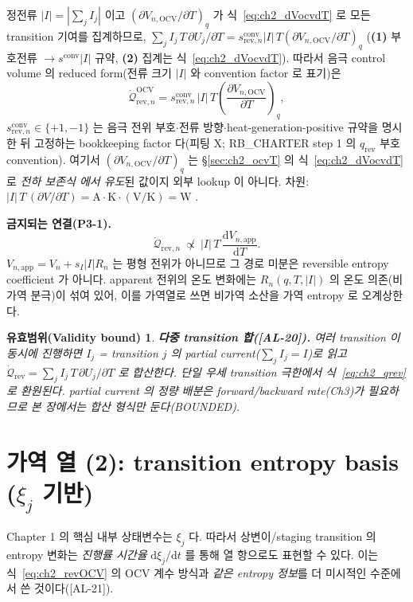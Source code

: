 \documentclass[11pt,a4paper]{article}
\newtheorem*{boundbox}{유효범위(Validity bound)}
\newcommand{\dd}{\mathrm{d}}
\newcommand{\app}{\mathrm{app}}
\newcommand{\OCV}{\mathrm{OCV}}
\newcommand{\rev}{\mathrm{rev}}
\newcommand{\conv}{\mathrm{conv}}
\newcommand{\AL}[1]{\textsf{[AL-#1]}}
\begin{document}
정전류 $|I|=|\sum_j I_j|$ 이고 $(\partial V_{n,\OCV}/\partial T)_q$ 가 식~\eqref{eq:ch2_dVocvdT} 로 모든 transition
기여를 집계하므로, $\sum_j I_j\,T\,\partial U_j/\partial T=s_{\rev,n}^{\conv}|I|\,T(\partial V_{n,\OCV}/\partial T)_q$
(\textbf{(1)} 부호전류 $\to s^{\conv}|I|$ 규약, \textbf{(2)} 집계는 식~\eqref{eq:ch2_dVocvdT}). 따라서 음극
control volume 의 reduced form(전류 크기 $|I|$ 와 convention factor 로 표기)은
\begin{equation}
\dot{\mathcal Q}_{\rev,n}^{\OCV}=s_{\rev,n}^{\conv}\,|I|\,T\left(\frac{\partial V_{n,\OCV}}{\partial T}\right)_q,
\label{eq:ch2_revOCV}
\end{equation}
$s_{\rev,n}^{\conv}\in\{+1,-1\}$ 는 음극 전위 부호$\cdot$전류 방향$\cdot$heat-generation-positive 규약을 명시한
뒤 고정하는 bookkeeping factor 다(피팅 X; RB\_CHARTER step 1 의 $q_\rev$ 부호 convention). 여기서
$(\partial V_{n,\OCV}/\partial T)_q$ 는 \S\ref{sec:ch2_ocvT} 의 식~\eqref{eq:ch2_dVocvdT} 로 \emph{전하 보존식
에서 유도}된 값이지 외부 lookup 이 아니다. 차원: $|I|\,T\,(\partial V/\partial T)=\mathrm A\cdot\mathrm K\cdot
\mathrm{(V/K)}=\mathrm W$ \checkmark.

\textbf{금지되는 연결(P3-1).}
\begin{equation}
\dot{\mathcal Q}_{\rev,n}\ \not\propto\ |I|\,T\,\frac{\dd V_{n,\app}}{\dd T}.
\label{eq:ch2_forbidden}
\end{equation}
$V_{n,\app}=V_n+s_I|I|R_n$ 는 평형 전위가 아니므로 그 경로 미분은 reversible entropy coefficient 가 아니다.
apparent 전위의 온도 변화에는 $R_n(q,T,|I|)$ 의 온도 의존(비가역 분극)이 섞여 있어, 이를 가역열로 쓰면 비가역
소산을 가역 entropy 로 오계상한다.
\begin{boundbox}
\textbf{다중 transition 합(\AL{20}).} 여러 transition 이 동시에 진행하면 $I_j$ = transition $j$ 의 partial
current($\sum_j I_j=I$)로 읽고 $\dot{\mathcal Q}_{\rev}=\sum_j I_j\,T\,\partial U_j/\partial T$ 로 합산한다.
단일 우세 transition 극한에서 식~\eqref{eq:ch2_qrev} 로 환원된다. partial current 의 정량 배분은 forward/backward
rate(Ch3)가 필요하므로 본 장에서는 합산 형식만 둔다(BOUNDED).
\end{boundbox}

\section{가역 열 (2): transition entropy basis ($\xi_j$ 기반)}\label{sec:ch2_revxi}
Chapter 1 의 핵심 내부 상태변수는 $\xi_j$ 다. 따라서 상변이/staging transition 의 entropy 변화는 \emph{진행률
시간율} $\dd\xi_j/\dd t$ 를 통해 열 항으로도 표현할 수 있다. 이는 식~\eqref{eq:ch2_revOCV} 의 OCV 계수 방식과
\emph{같은 entropy 정보}를 더 미시적인 수준에서 쓴 것이다(\AL{21}).
\end{document}
